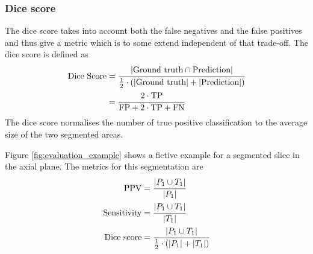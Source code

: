 \documentclass[12pt,a4paper,twoside,openright]{report}
\begin{document}
\subsubsection{Dice score}
The dice score takes into account both the false negatives and the false positives and thus give a metric which is to some extend independent of that trade-off. The dice score is defined as
\begin{equation}
\begin{split}
	\textrm{Dice Score} & = \cfrac{\vert \textrm{Ground truth} \cap \textrm{Prediction}\vert}{\frac{1}{2} \cdot (\vert \textrm{Ground truth}\vert + \vert \textrm{Prediction}\vert)} \\
	&  = \cfrac{2 \cdot \textrm{TP}}{\textrm{FP} + 2 \cdot \textrm{TP} + \textrm{FN}}
\end{split}
\end{equation}
The dice score normalises the number of true positive classification to the average size of the two segmented areas.

Figure \ref{fig:evaluation_example} shows a fictive example for a segmented slice in the axial plane.  The metrics for this segmentation are
\begin{equation*}
\begin{split}
	\textrm{PPV} & = \cfrac{\vert P_1 \cup T_1 \vert}{\vert P_1 \vert} \\
	\textrm{Sensitivity} & = \cfrac{\vert P_1 \cup T_1 \vert}{\vert T_1 \vert} \\
	\textrm{Dice score} & = \cfrac{\vert P_1 \cup T_1 \vert}{\frac{1}{2} \cdot (\vert P_1 \vert + \vert T_1 \vert)} \\
\end{split}
\end{equation*}
\end{document}
